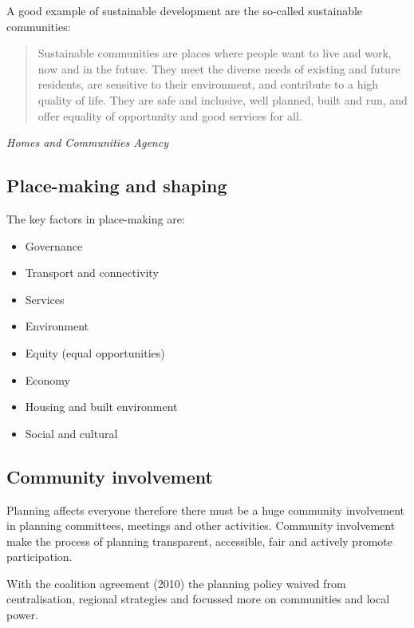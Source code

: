 \documentclass{article}
\begin{document}
	A good example of sustainable development are the so-called sustainable communities:
	\begin{quote}
		Sustainable communities are places where people want to live and work, now and in the future.
		They meet the diverse needs of existing and future residents, are sensitive to their environment,
		and contribute to a high quality of life. They are safe and inclusive, well planned, built and run,
		and offer equality of opportunity and good services for all.
	\end{quote}
	\textit{Homes and Communities Agency}
	
	\subsection*{Place-making and shaping}	
	The key factors in place-making are:
	\begin{itemize}
		\item Governance
		\item Transport and connectivity
		\item Services
		\item Environment
		\item Equity (equal opportunities)
		\item Economy
		\item Housing and built environment
		\item Social and cultural
	\end{itemize}		
	
	\subsection*{Community involvement}	
	Planning affects everyone therefore there must be a huge community involvement in planning committees,
	meetings and other activities. Community involvement make the process of planning transparent,
	accessible, fair and actively promote participation.
	
	With the coalition agreement (2010) the planning policy waived from centralisation, regional strategies
	and focussed more on communities and local power.
	
	
\end{document}
